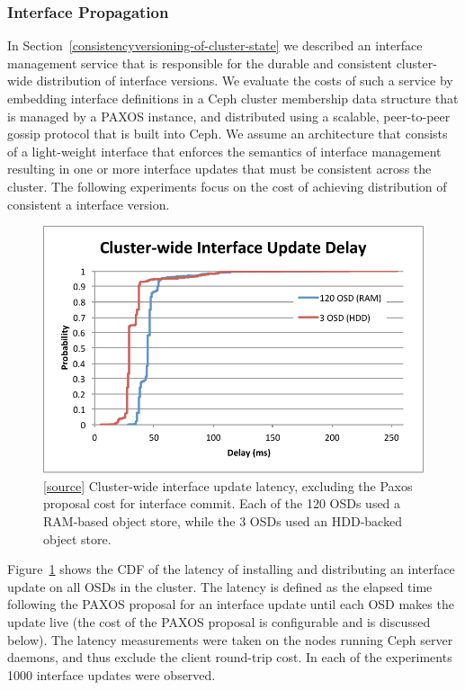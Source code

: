 \documentclass[preprint]{sigplanconf-eurosys}
\begin{document}
\subsubsection{Interface Propagation}

In Section~\ref{consistencyversioning-of-cluster-state} we described an
interface management service that is responsible for the durable and
consistent cluster-wide distribution of interface versions. We evaluate the
costs of such a service by embedding interface definitions in a Ceph cluster
membership data structure that is managed by a PAXOS instance, and distributed
using a scalable, peer-to-peer gossip protocol that is built into Ceph. We
assume an architecture that consists of a light-weight interface that enforces
the semantics of interface management resulting in one or more interface
updates that must be consistent across the cluster. The following experiments
focus on the cost of achieving distribution of consistent a interface version.

\begin{figure}[h]
\centering
\includegraphics[trim={1 4 4 1.3cm},clip]{figures/iface-update-delay.pdf}
\caption{[\href{https://github.com/double-blind-submitter/osdi16}{source}]
Cluster-wide interface update latency, excluding the Paxos proposal cost for
interface commit. Each of the 120 OSDs used a RAM-based object store, while the
3 OSDs used an HDD-backed object store.}
\label{fig:propdelay}
\end{figure}

Figure~\ref{fig:propdelay} shows the CDF of the latency of installing and
distributing an interface update on all OSDs in the cluster. The latency is
defined as the elapsed time following the PAXOS proposal for an interface
update until each OSD makes the update live (the cost of the PAXOS proposal is
configurable and is discussed below). The latency measurements were taken on
the nodes running Ceph server daemons, and thus exclude the client round-trip
cost. In each of the experiments 1000 interface updates were observed.
\end{document}
